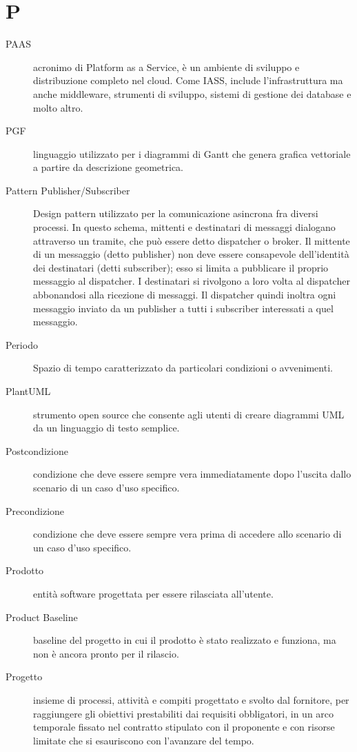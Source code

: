 \documentclass{article}
\begin{document}
  \section{P}
  \begin{description}
    \item[PAAS] acronimo di Platform as a Service, è un ambiente di sviluppo e distribuzione completo nel cloud. Come IASS, include l'infrastruttura ma anche middleware, strumenti di sviluppo, sistemi di gestione dei database e molto altro.
    \item[PGF] linguaggio utilizzato per i diagrammi di Gantt che genera grafica vettoriale a partire da descrizione geometrica.
    \item[Pattern Publisher/Subscriber] Design pattern utilizzato per la comunicazione asincrona fra diversi processi. In questo schema, mittenti e destinatari di messaggi dialogano attraverso un tramite, che può essere detto dispatcher o broker. Il mittente di un messaggio (detto publisher) non deve essere consapevole dell'identità dei destinatari (detti subscriber); esso si limita a pubblicare il proprio messaggio al dispatcher. I destinatari si rivolgono a loro volta al dispatcher abbonandosi alla ricezione di messaggi. Il dispatcher quindi inoltra ogni messaggio inviato da un publisher a tutti i subscriber interessati a quel messaggio.
    \item[Periodo] Spazio di tempo caratterizzato da particolari condizioni o avvenimenti.
    \item[PlantUML] strumento open source che consente agli utenti di creare diagrammi UML da un linguaggio di testo semplice.
    \item[Postcondizione] condizione che deve essere sempre vera immediatamente dopo l'uscita dallo scenario di un caso d'uso specifico.
    \item[Precondizione] condizione che deve essere sempre vera prima di accedere allo scenario di un caso d'uso specifico.
    \item[Prodotto] entità software progettata per essere rilasciata all'utente.
    \item[Product Baseline] baseline del progetto in cui il prodotto è stato realizzato e funziona, ma non è ancora pronto per il rilascio.
    \item[Progetto] insieme di processi, attività e compiti progettato e svolto dal fornitore, per raggiungere gli obiettivi prestabiliti dai requisiti obbligatori, in un arco temporale fissato nel contratto stipulato con il proponente e con risorse limitate che si esauriscono con l'avanzare del tempo.

\end{description}
\end{document}
